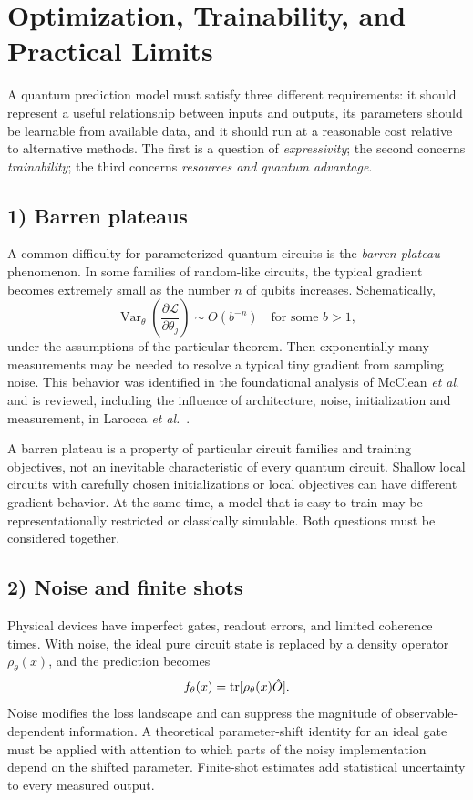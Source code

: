 \section{Optimization, Trainability, and Practical Limits}
A quantum prediction model must satisfy three different requirements: it should represent a useful relationship between inputs and outputs, its parameters should be learnable from available data, and it should run at a reasonable cost relative to alternative methods. The first is a question of \emph{expressivity}; the second concerns \emph{trainability}; the third concerns \emph{resources and quantum advantage}.

\subsection*{1) Barren plateaus}
A common difficulty for parameterized quantum circuits is the \emph{barren plateau} phenomenon. In some families of random-like circuits, the typical gradient becomes extremely small as the number $n$ of qubits increases. Schematically,
\begin{equation}
\operatorname{Var}_{\theta}\left(\frac{\partial\mathcal L}{\partial\theta_j}\right)
\sim O(b^{-n})\quad\text{for some }b>1,
\end{equation}
under the assumptions of the particular theorem. Then exponentially many measurements may be needed to resolve a typical tiny gradient from sampling noise. This behavior was identified in the foundational analysis of McClean \emph{et al.}~\cite{McClean2018} and is reviewed, including the influence of architecture, noise, initialization and measurement, in Larocca \emph{et al.}~\cite{Larocca2025}.

A barren plateau is a property of particular circuit families and training objectives, not an inevitable characteristic of every quantum circuit. Shallow local circuits with carefully chosen initializations or local objectives can have different gradient behavior. At the same time, a model that is easy to train may be representationally restricted or classically simulable. Both questions must be considered together.

\subsection*{2) Noise and finite shots}
Physical devices have imperfect gates, readout errors, and limited coherence times. With noise, the ideal pure circuit state is replaced by a density operator $\rho_\theta(x)$, and the prediction becomes
\begin{equation}
 f_\theta(x)=\operatorname{tr}[\rho_\theta(x)\hat{O}].
\end{equation}
Noise modifies the loss landscape and can suppress the magnitude of observable-dependent information. A theoretical parameter-shift identity for an ideal gate must be applied with attention to which parts of the noisy implementation depend on the shifted parameter. Finite-shot estimates add statistical uncertainty to every measured output.

